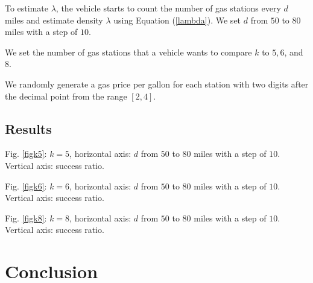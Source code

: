 \documentclass[conference]{IEEEtran}
\theoremstyle{definition}
\begin{document}
To estimate $\lambda$, the vehicle starts to count the number of gas stations every $d$ miles and estimate  density $\lambda$ using Equation (\ref{lambda}). We set $d$ from $50$ to $80$ miles with a step of $10$.

We set the number of gas stations that a vehicle wants to compare $k$ to $5, 6$, and $8$.

We randomly generate a gas price per gallon for each station with two digits after the decimal point from the range $[2, 4]$.

\subsection{Results}
Fig. \ref{figk5}: $k=5$, horizontal axis: $d$ from $50$ to $80$ miles with a step of $10$. Vertical axis: success ratio.

Fig. \ref{figk6}: $k=6$, horizontal axis: $d$ from $50$ to $80$ miles with a step of $10$. Vertical axis: success ratio.

Fig. \ref{figk8}: $k=8$, horizontal axis: $d$ from $50$ to $80$ miles with a step of $10$. Vertical axis: success ratio.

\section{Conclusion} \label{conclusion}



\end{document}
